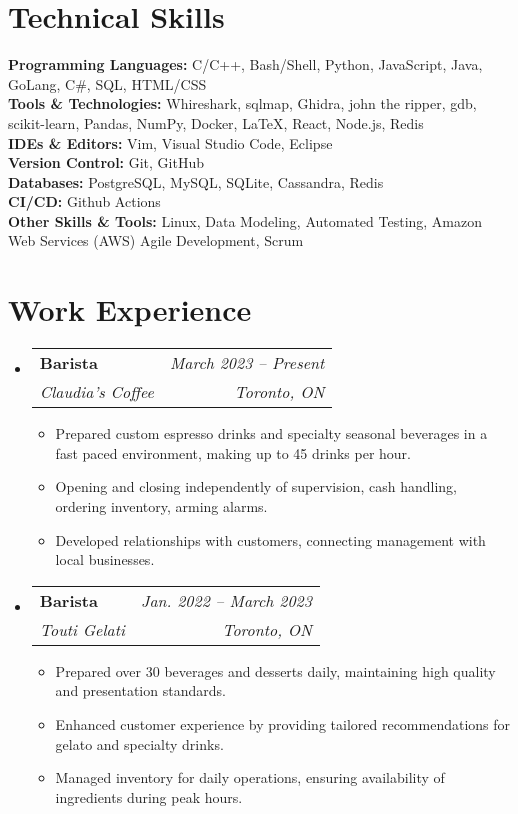 \documentclass[letterpaper,11pt]{article}
\makeatletter
\newcommand{\resumeItem}[1]{
  \item\small{
    {#1 \vspace{-2pt}}
  }
}
\newcommand{\resumeSubheading}[4]{
  \vspace{-2pt}\item
    \begin{tabular*}{0.97\textwidth}[t]{l@{\extracolsep{\fill}}r}
      \textbf{#1} & #2 \\
      \textit{\small#3} & \textit{\small #4} \\
    \end{tabular*}\vspace{-7pt}
}
\newcommand{\resumeSubHeadingListStart}{\begin{itemize}[leftmargin=0.15in, label={}]}
\newcommand{\resumeSubHeadingListEnd}{\end{itemize}}
\newcommand{\resumeItemListStart}{\begin{itemize}}
\newcommand{\resumeItemListEnd}{\end{itemize}\vspace{-5pt}}
\makeatother
\begin{document}
%
\section{Technical Skills}
 \begin{itemize}[leftmargin=0.15in, label={}]
    \small{\item{
	\textbf{Programming Languages:} C/C++, Bash/Shell, Python, JavaScript, Java, GoLang, C\#, SQL, HTML/CSS\\
	\textbf{Tools \& Technologies:} Whireshark, sqlmap, Ghidra, john the ripper, gdb, scikit-learn, Pandas, NumPy, Docker, LaTeX, React, Node.js, Redis \\
	\textbf{IDEs \& Editors:} Vim, Visual Studio Code, Eclipse \\
	\textbf{Version Control:} Git, GitHub \\
	\textbf{Databases:} PostgreSQL, MySQL, SQLite, Cassandra, Redis\\
	\textbf{CI/CD:} Github Actions \\
	\textbf{Other Skills \& Tools:} Linux, Data Modeling, Automated Testing, Amazon Web Services (AWS) Agile Development, Scrum
    }}
 \end{itemize}


\section{Work Experience}
  \resumeSubHeadingListStart

    \resumeSubheading
    {Barista}{\emph{March 2023 -- Present}}
      {Claudia's Coffee}{Toronto, ON}
      \resumeItemListStart
        \resumeItem{Prepared custom espresso drinks and specialty seasonal beverages in a fast paced environment, making up to 45 drinks per hour.}
	\resumeItem{Opening and closing independently of supervision, cash handling, ordering inventory, arming alarms.}
	\resumeItem{Developed relationships with customers, connecting management with local businesses.}
      \resumeItemListEnd

    \resumeSubheading
    {Barista}{\emph{Jan. 2022 -- March 2023}}
      {Touti Gelati}{Toronto, ON}
      \resumeItemListStart
      \resumeItem{Prepared over 30 beverages and desserts daily, maintaining high quality and presentation standards.}
      \resumeItem{Enhanced customer experience by providing tailored recommendations for gelato and specialty drinks.}
      \resumeItem{Managed inventory for daily operations, ensuring availability of ingredients during peak hours.}
      \resumeItemListEnd
  \resumeSubHeadingListEnd


\end{document}
